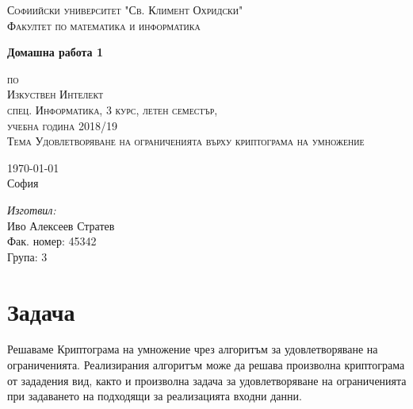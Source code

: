 \documentclass[a4paper, 12pt]{article}
\newcommand{\univname}{Софиийски университет "Св. Климент Охридски"\\Факултет по математика и информатика}
\begin{document}
\begin{titlepage}
\begin{center}
    
\vspace*{.06\textheight}
{\scshape\large \univname\par}\vspace{1.5cm}

{\huge \bfseries{Домашна работа 1}\par}\vspace{0.7cm}
\textsc{\small по}\\[0.6cm]
\textsc{\Large Изкуствен Интелект}\\[0.5cm]
\textsc{\normalsize спец. Информатика, 3 курс, летен семестър,}\\[0.5cm]
\textsc{\normalsize учебна година 2018/19}\\[0.6cm]
\textsc{\large Тема Удовлетворяване на ограниченията върху криптограма на умножение}\\[3cm]
     
\begin{minipage}[t]{0.4\textwidth}
\begin{flushleft} \large
{\large \today}\\[1cm]
София
\end{flushleft}
\end{minipage}
\begin{minipage}[t]{0.4\textwidth}
\begin{flushright} \large
\emph{Изготвил:}\\[0.5cm]
Иво Алексеев Стратев\\[0.5cm]
Фак. номер: 45342\\[0.2cm]
Група: 3
\end{flushright}
\end{minipage}
\end{center}
\end{titlepage}

\tableofcontents

\pagebreak

\section{Задача}
Решаваме Криптограма на умножение чрез алгоритъм за удовлетворяване на ограниченията.
Реализирания алгоритъм може да решава произволна криптограма от зададения вид,
както и произволна задача за удовлетворяване на ограниченията при задаването на подходящи за реализацията входни данни.
\end{document}
